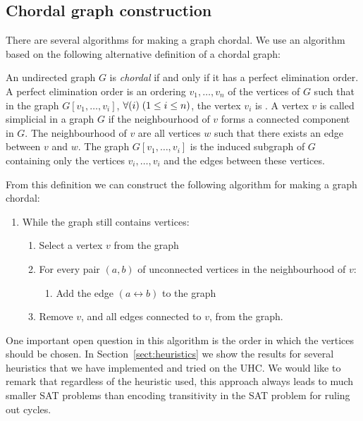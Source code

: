 \documentclass{llncs}
\newcommand{\sectref}[1]{Section~\ref{#1}}
\begin{document}
\subsection{Chordal graph construction} \label{sect:chordalconstruct}
There are several algorithms for making a graph chordal. We use an algorithm based on the following alternative definition of a chordal graph:

\begin{definition}
An undirected graph $G$ is \emph{chordal} if and only if it has a 
perfect elimination order. A perfect elimination order is an
ordering $v_1,\ldots,v_n$ of the vertices of $G$ such that in the graph
$G[v_1,\ldots,v_i]$, $\forall(i)\;(1 \leq i \leq n)$, the vertex $v_i$ is 
. A vertex $v$ is called simplicial in a graph $G$ if
the neighbourhood of $v$ forms a connected component in $G$.
The neighbourhood of $v$ are all vertices $w$ such that there exists an edge between $v$ and $w$.
The graph $G[v_1,\ldots,v_i]$ is the induced subgraph of $G$ containing
only the vertices $v_i,\ldots,v_i$ and the edges between these vertices.
\end{definition}

From this definition we can construct the following algorithm for making a graph chordal:
\begin{enumerate}
 \item While the graph still contains vertices:
 \begin{enumerate}
     \item Select a vertex $v$ from the graph
     \item For every pair $(a,b)$ of unconnected vertices in the neighbourhood
        of $v$: 
        \begin{enumerate}
            \item Add the edge $(a\leftrightarrow b)$ to the graph
        \end{enumerate}
     \item Remove $v$, and all edges connected to $v$, from the graph.
 \end{enumerate}
\end{enumerate}

One important open question in this algorithm is the order in which the vertices should be chosen. In \sectref{sect:heuristics} we show the results for several heuristics that we have implemented and tried on the UHC. We would like to remark that regardless of the heuristic used, this approach always leads to much smaller SAT problems than encoding transitivity in the SAT problem for ruling out cycles.
\end{document}
